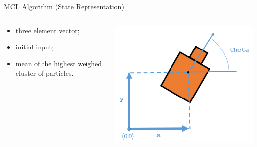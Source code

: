 \begin{frame}{MCL Algorithm (State Representation)}
    
    \begin{columns}
        \begin{column}{0.55\textwidth}
            \begin{itemize}
                \item three element vector;
                \item initial input;
                \item mean of the highest weighed cluster of particles.
            \end{itemize}
        \end{column}
        \hfill
        \begin{column}{0.35\textwidth}
            \includegraphics[width=\columnwidth]{figures/robot_pose.png}
        \end{column}
    \end{columns}

\end{frame}


